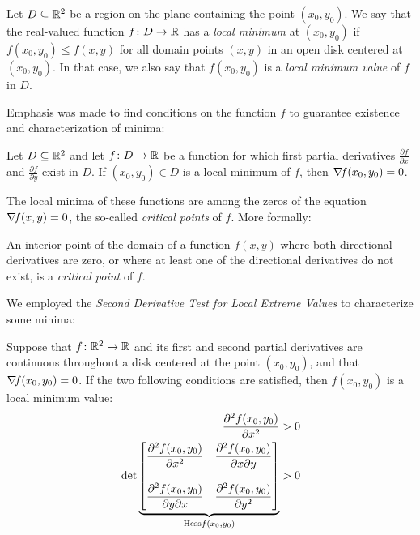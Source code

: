 \begin{definition}\label{def:localminimum}
Let $D\subseteq \mathbb{R}^2$ be a region on the plane containing the point $(x_0, y_0)$.  We say that the real-valued function $f\colon D \to \mathbb{R}$ has a \emph{local minimum} at $(x_0,y_0)$ if $f(x_0,y_0) \leq f(x,y)$ for all domain points $(x,y)$ in an open disk centered at $(x_0,y_0)$.  In that case, we also say that $f(x_0,y_0)$ is a \emph{local minimum value} of $f$ in $D$.
\end{definition}

\separator 

Emphasis was made to find conditions on the function $f$ to guarantee existence and characterization of minima:

\begin{theorem}\label{theorem:localminimum}
Let $D \subseteq \mathbb{R}^2$ and let $f \colon D \to \mathbb{R}$ be a function for which first partial derivatives $\frac{\partial f}{\partial x}$ and $\frac{\partial f}{\partial y}$ exist in $D$.  If $(x_0,y_0) \in D$ is a local minimum of $f$, then $\mathop{\nabla\! {f}}(x_0,y_0)=0$.
\end{theorem}

The local minima of these functions are among the zeros of the equation $\mathop{\nabla\! {f}}(x,y)=0$, the so-called \emph{critical points} of $f$. More formally:

\begin{definition}\label{def:criticalpoint}
An interior point of the domain of a function $f(x,y)$ where both directional derivatives are zero, or where at least one of the directional derivatives do not exist, is a \emph{critical point} of $f$.
\end{definition}

\separator 

We employed the \emph{Second Derivative Test for Local Extreme Values} to characterize some minima:
\begin{theorem}\label{theorem:2DTforLEV}
Suppose that $f\colon \mathbb{R}^2 \to \mathbb{R}$ and its first and second partial derivatives are continuous throughout a disk centered at the point $(x_0,y_0)$, and that $\mathop{\nabla\! {f}}(x_0,y_0)=0$. If the two following conditions are satisfied, then $f(x_0,y_0)$ is a local minimum value:
\begin{align}
\frac{\partial^2 f (x_0,y_0)}{\partial x^2} &> 0 \\
\det \underbrace{\begin{bmatrix} 
\dfrac{\partial^2 f (x_0,y_0)}{\partial x^2} & \dfrac{\partial^2 f (x_0,y_0)}{\partial x \partial y} \\ & \\
\dfrac{\partial^2 f (x_0,y_0) }{\partial y \partial x} & \dfrac{\partial^2 f (x_0,y_0)}{\partial y^2}
\end{bmatrix}}_{\mathop{\mathrm{Hess}{f}}(x_0,y_0)} &> 0
\end{align}
\end{theorem}

